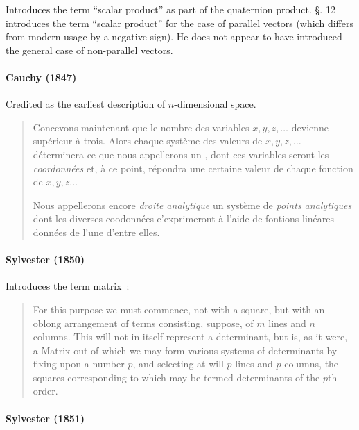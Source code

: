 Introduces the term ``scalar product'' as part of the quaternion product.
\S. 12 introduces the term ``scalar product'' for the case of parallel vectors (which differs from modern usage by a negative sign).
He does not appear to have introduced the general case of non-parallel vectors.



\paragraph{Cauchy (1847)~\cite{Cauchy1847}}

Credited  as the earliest description of $n$-dimensional space.

\begin{quote}
Concevons maintenant que le nombre des variables $x, y, z, \dots$
devienne sup\'erieur \`a trois. Alors chaque syst\`eme des valeurs de
$x, y, z, \dots$ d\'eterminera ce que nous appellerons un , dont
ces variables seront les \textit{coordonn\'ees} et, \`a ce point, r\'epondra une
certaine valeur de chaque fonction de $x, y, z \dots$

Nous appellerons encore \textit{droite analytique} un syst\`eme de \textit{points
analytiques} dont les diverses coodonn\'ees e'exprimeront \`a l'aide de
fontions lin\'eares donn\'ees de l'une d'entre elles.
\end{quote}



\paragraph{Sylvester (1850)~\cite{Sylvester1850}}

Introduces the term matrix~\cite[p. 150]{Sylvester1850}:

\begin{quote}
For this purpose we must commence, not with a square, but with an oblong arrangement
of terms consisting, suppose,
of $m$ lines and $n$ columns. This will not in itself represent a determinant,
but is, as it were, a Matrix out of which we may form various systems of
determinants by fixing upon a number $p$, and selecting at will $p$ lines and $p$
columns, the squares corresponding to which may be termed determinants
of the $p$th order.
\end{quote}

\paragraph{Sylvester (1851)~\cite{Sylvester1851}}

